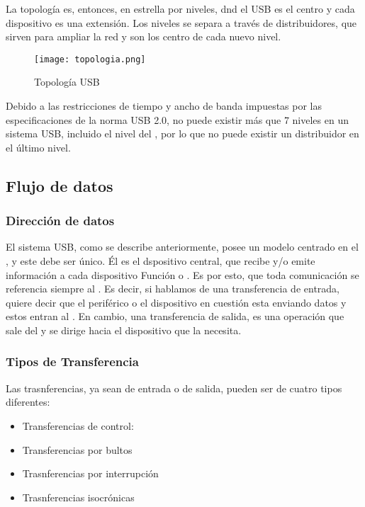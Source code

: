     La topología es, entonces, en estrella por niveles, dnd el \host USB es el
    centro y cada dispositivo es una extensión. Los niveles se separa a través
    de distribuidores, que sirven para ampliar la red y son los centro de cada
    nuevo nivel.\\

    \begin{figure}
      \centering
      \texttt{[image: topologia.png]}
      \caption{Topología USB}
      \label{}
    \end{figure}

    Debido a las restricciones de tiempo y ancho de banda impuestas por las
    especificaciones de la norma USB 2.0, no puede existir más que 7 niveles
    en un sistema USB, incluido el nivel del \host, por lo que no puede existir
    un distribuidor en el último nivel.\\

    \subsection{Flujo de datos}
      \subsubsection{Dirección de datos}
      El sistema USB, como se describe anteriormente, posee un modelo centrado
      en el \host, y este debe ser único. Él es el dspositivo central, que
      recibe y/o emite información a cada dispositivo Función o \Hub. Es por
      esto, que toda comunicación se referencia siempre al \host. Es decir, si
      hablamos de una transferencia de entrada, quiere decir que el periférico
      o el dispositivo en cuestión esta enviando datos y estos entran al \host.
      En cambio, una transferencia de salida, es una operación que sale del
      \host y se dirige hacia el dispositivo que la necesita.

      \subsubsection{Tipos de Transferencia}
      Las trasnferencias, ya sean de entrada o de salida, pueden ser de cuatro
      tipos diferentes:

      \begin{itemize}
         \item Transferencias de control:
         \item Transferencias por bultos
         \item Trasnferencias por interrupción
         \item Trasnferencias isocrónicas
      \end{itemize}


